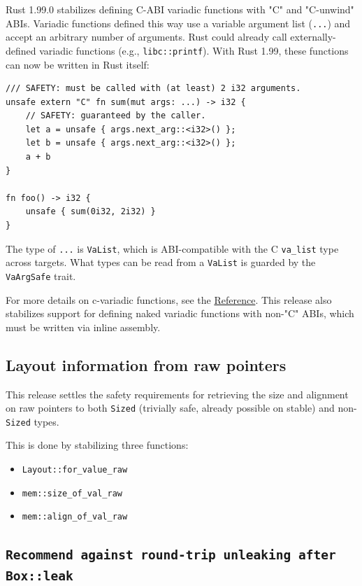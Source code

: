 \documentclass[11pt,a4paper]{article}
\begin{document}
Rust 1.99.0 stabilizes defining C-ABI variadic functions with "C" and "C-unwind" ABIs. Variadic functions defined this way use a variable argument list (\texttt{...}) and accept an arbitrary number of arguments. Rust could already call externally-defined variadic functions (e.g., \texttt{libc::printf}). With Rust 1.99, these functions can now be written in Rust itself:

\begin{verbatim}
/// SAFETY: must be called with (at least) 2 i32 arguments.
unsafe extern "C" fn sum(mut args: ...) -> i32 {
    // SAFETY: guaranteed by the caller.
    let a = unsafe { args.next_arg::<i32>() };
    let b = unsafe { args.next_arg::<i32>() };
    a + b
}

fn foo() -> i32 {
    unsafe { sum(0i32, 2i32) }
}
\end{verbatim}

The type of \texttt{...} is \texttt{VaList}, which is ABI-compatible with the C \texttt{va_list} type across targets. What types can be read from a \texttt{VaList} is guarded by the \texttt{VaArgSafe} trait.

For more details on c-variadic functions, see the \href{https://doc.rust-lang.org/reference/items/functions.html\#c-variadic-functions}{Reference}. This release also stabilizes support for defining naked variadic functions with non-"C" ABIs, which must be written via inline assembly.

\subsection{Layout information from raw pointers}

This release settles the safety requirements for retrieving the size and alignment on raw pointers to both \texttt{Sized} (trivially safe, already possible on stable) and non-\texttt{Sized} types.

This is done by stabilizing three functions:

\begin{itemize}
\item \texttt{Layout::for_value_raw}
\item \texttt{mem::size_of_val_raw}
\item \texttt{mem::align_of_val_raw}
\end{itemize}

\subsection{\texttt{Recommend against round-trip unleaking after Box::leak}}
\end{document}
